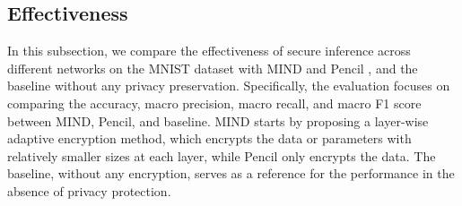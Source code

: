 \documentclass[conference]{IEEEtran}
\begin{document}
\begin{itemize}
\end{itemize}











\subsection{Effectiveness}
In this subsection, we compare the effectiveness of secure inference across different networks on the MNIST dataset with MIND and Pencil \cite{liu2024pencilprivateextensiblecollaborative}, and the baseline without any privacy preservation.
Specifically, the evaluation focuses on comparing the accuracy, macro precision, macro recall, and macro F1 score between MIND, Pencil, and baseline.
MIND starts by proposing a layer-wise adaptive encryption method, which encrypts the data or parameters with relatively smaller sizes at each layer, while Pencil only encrypts the data. The baseline, without any encryption, serves as a reference for the performance in the absence of privacy protection.














\end{document}
